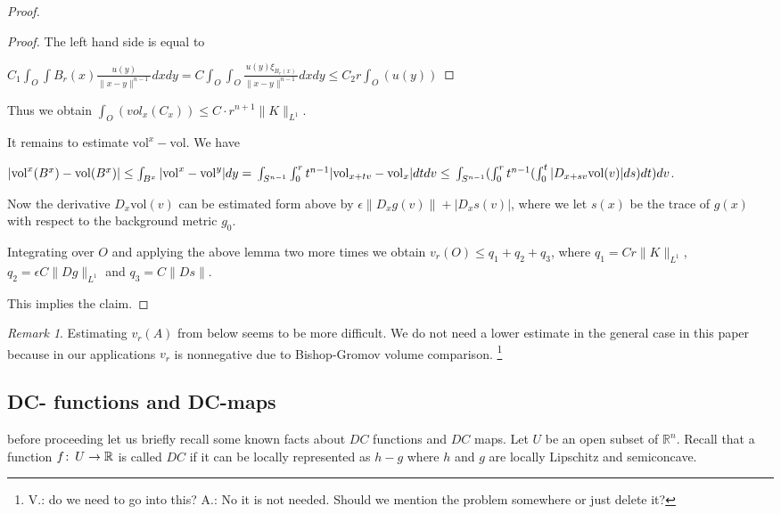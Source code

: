 \documentclass[12pt,leqno]{amsart}
\numberwithin{equation}{section}
\theoremstyle{definition}
\theoremstyle{remark}
\newtheorem{rem}[thm]{Remark}
\newcommand{\vol}{\mathrm{vol}}
\newcommand{\R}{\mathbb{R}}
\def\co{\colon\thinspace}
\begin{document}
\begin{proof}
     \begin{proof}
     The left hand side is equal to

     $C_1 \int _O \int B_r (x) \frac {u(y)}  {\|x-y\| ^{n-1}} dx dy = C \int _O \int _O \frac {u(y) \xi _{B_r (x)}}
     {\|x-y\| ^{n-1}} dx dy \leq C_2 r  \int _O (u(y))$
     \end{proof}


      Thus we obtain $\int _O (vol _x (C_x)) \leq C \cdot r^{n+1} \|K\| _{L^1}$.


      It remains to estimate $\vol ^x - \vol$. We have

      $|\vol ^x (B^x) -\vol (B^x)| \leq \int _ {B^x} |\vol ^x -\vol ^y| dy = \\
      \int _{S^{n-1}} \int _0 ^r  t^{n-1} | \vol _{x+tv} - \vol _x| dt dv \leq  \\
       \int _{ S^{n-1}} (\int _0 ^r t^{n-1} (\int _0 ^t  |D_{x+sv} \vol (v)| ds) dt) dv$.

      Now the derivative $D_x \vol (v)$ can be estimated form above by $\epsilon \|D_xg (v)\| + | D_x s (v)|$,
      where we let $s(x)$ be the trace of $g(x)$ with respect to the background metric $g_0$.

      Integrating over $O$ and applying the above lemma two more times we obtain
      $v_r (O) \leq q_1 +q_2 +q_3$, where
      $q_1 = C r \|K\| _{L^1}$, $q_2 = \epsilon C \| Dg\| _{L^1} $ and $q_3 = C \|Ds\|$.

      This implies the claim.
    \end{proof}


\begin{rem}
Estimating  $v_r (A)$ from below seems to be more difficult.  We do not need a lower estimate  in the general case in this paper because in our applications $v_r$ is nonnegative due to Bishop-Gromov volume comparison. \footnote{ {V.:\color{red} do we need to go into this?} A.: No it is not needed. Should we mention the problem somewhere or just delete it?  }
\end{rem}

\subsection{DC- functions and DC-maps}
before proceeding let us briefly recall some known facts about $DC$ functions and $DC$ maps.
Let $U$ be an open subset of $\R^n$.
Recall that a function $f\co U\to \R$ is called $DC$ if it can be locally represented as  $h-g$ where $h$ and $g$ are locally Lipschitz and semiconcave.
\end{document}
